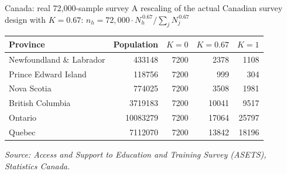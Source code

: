 \documentclass[aspectratio=169,11pt]{beamer}
\newcommand{\mynote}[1]{\vspace{0.4em}\footnotesize\color{gray}#1}
\begin{document}
	\begin{frame}{Canada: real 72{,}000-sample survey}
		A rescaling of the actual Canadian survey design with
		\textbf{\color{amber}$K=0.67$}:\quad
		$n_h = 72{,}000 \cdot N_h^{\,0.67} \big/ \sum_j N_j^{\,0.67}$
		\vspace{0.3em}
		\begin{center}
			{\renewcommand{\arraystretch}{1.18}\setlength{\tabcolsep}{12pt}
				\begin{tabular}{l r r r r}
					\toprule
					\textbf{Province} & \textbf{Population}
					& $K{=}0$ & \textbf{\color{amber}$K{=}0.67$} & $K{=}1$ \\
					\midrule
					Newfoundland \& Labrador & \num{433148}   & \num{7200} & \color{amber}\num{2378}  & \num{1108}  \\
					Prince Edward Island     & \num{118756}   & \num{7200} & \color{amber}\num{999}   & \num{304}   \\
					Nova Scotia              & \num{774025}   & \num{7200} & \color{amber}\num{3508}  & \num{1981}  \\
					British Columbia         & \num{3719183}  & \num{7200} & \color{amber}\num{10041} & \num{9517}  \\
					Ontario                  & \num{10083279} & \num{7200} & \color{amber}\num{17064} & \num{25797} \\
					Quebec                   & \num{7112070}  & \num{7200} & \color{amber}\num{13842} & \num{18196} \\
					\bottomrule
			\end{tabular}}
		\end{center}
		\mynote{\textit{Source: Access and Support to Education and Training Survey (ASETS), Statistics Canada.}}
	\end{frame}
	
\end{document}
